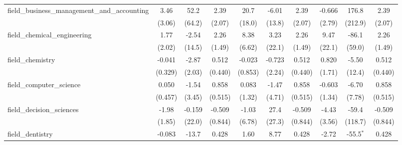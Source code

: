 \begin{tabular}{lccccccccc}
   field\_business\_management\_and\_accounting                & 3.46           & 52.2           & 2.39           & 20.7           & -6.01         & 2.39           & -0.666         & 176.8          & 2.39\\   
                                                               & (3.06)         & (64.2)         & (2.07)         & (18.0)         & (13.8)        & (2.07)         & (2.79)         & (212.9)        & (2.07)\\   
   field\_chemical\_engineering                                & 1.77           & -2.54          & 2.26           & 8.38           & 3.23          & 2.26           & 9.47           & -86.1          & 2.26\\   
                                                               & (2.02)         & (14.5)         & (1.49)         & (6.62)         & (22.1)        & (1.49)         & (22.1)         & (59.0)         & (1.49)\\   
   field\_chemistry                                            & -0.041         & -2.87          & 0.512          & -0.023         & -0.723        & 0.512          & 0.820          & -5.50          & 0.512\\   
                                                               & (0.329)        & (2.03)         & (0.440)        & (0.853)        & (2.24)        & (0.440)        & (1.71)         & (12.4)         & (0.440)\\   
   field\_computer\_science                                    & 0.050          & -1.54          & 0.858          & 0.083          & -1.47         & 0.858          & -0.603         & -6.70          & 0.858\\   
                                                               & (0.457)        & (3.45)         & (0.515)        & (1.32)         & (4.71)        & (0.515)        & (1.34)         & (7.78)         & (0.515)\\   
   field\_decision\_sciences                                   & -1.98          & -0.159         & -0.509         & -1.03          & 27.4          & -0.509         & -4.43          & -59.4          & -0.509\\   
                                                               & (1.85)         & (22.0)         & (0.844)        & (6.78)         & (27.3)        & (0.844)        & (3.56)         & (118.7)        & (0.844)\\   
   field\_dentistry                                            & -0.083         & -13.7          & 0.428          & 1.60           & 8.77          & 0.428          & -2.72          & -55.5$^{*}$    & 0.428\\   

\end{tabular}

